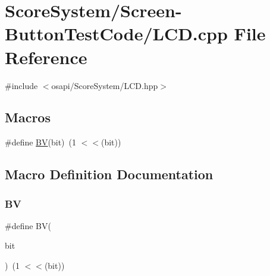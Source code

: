 \hypertarget{_screen-_button_test_code_2_l_c_d_8cpp}{}\section{Score\+System/\+Screen-\/\+Button\+Test\+Code/\+L\+CD.cpp File Reference}
\label{_screen-_button_test_code_2_l_c_d_8cpp}
{\ttfamily \#include $<$osapi/\+Score\+System/\+L\+C\+D.\+hpp$>$}\newline
\subsection*{Macros}
\begin{DoxyCompactItemize}
\item 
\#define \hyperlink{_screen-_button_test_code_2_l_c_d_8cpp_a0188837b5508334447b93ad7b944a0e9}{BV}(bit)~(1 $<$$<$(bit))
\end{DoxyCompactItemize}


\subsection{Macro Definition Documentation}
\mbox{\label{_screen-_button_test_code_2_l_c_d_8cpp_a0188837b5508334447b93ad7b944a0e9}} 
\subsubsection{\texorpdfstring{BV}{BV}}
{\footnotesize\ttfamily \#define BV(\begin{DoxyParamCaption}\item[{}]{bit }\end{DoxyParamCaption})~(1 $<$$<$(bit))}

